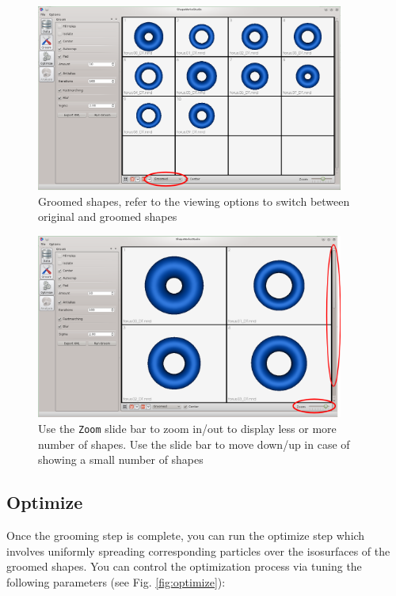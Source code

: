 \documentclass[letterpaper,12pt]{article}   %
\begin{document}
\begin{figure}[!htp]
\centering
\includegraphics[width=0.9\textwidth]{figs/groomed.png}
\caption{Groomed shapes, refer to the viewing options to switch between original and groomed shapes}
\label{fig:groomed}
\end{figure}

\begin{figure}[!htp]
\centering
\includegraphics[width=0.9\textwidth]{figs/zoom.png}
\caption{Use the \texttt{Zoom} slide bar to zoom in/out to display less or more number of shapes. Use the slide bar to move down/up in case of showing a small number of shapes}
\label{fig:zoom}
\end{figure}

\subsection{Optimize}

Once the grooming step is complete, you can run the optimize step which involves uniformly spreading corresponding particles over the isosurfaces of the groomed shapes. You can control the optimization process via tuning the following parameters (see Fig. \ref{fig:optimize}):
\end{document}
